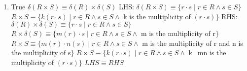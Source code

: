 \documentclass{4320hw}
\begin{document}
\begin{exercises}
\begin{enumerate}
\item
True
\newline
$\delta(R \times S) \equiv \delta(R) \times \delta(S)$
\newline
LHS:
\newline
$\delta(R \times S) \equiv \{ r \cdot s \mid r \in R \wedge s \in S\}$
\newline
$R \times S  \equiv \{k(r \cdot s) \mid r \in R \wedge s \in S \wedge $ k is the multiplicity of $(r \cdot s) \}$
\newline 
RHS:
\newline
$\delta(R) \times \delta(S) \equiv  \{ r \cdot s \mid r \in R \wedge s \in S\}$ 
\newline
$R \times \delta(S) \equiv \{ m(r) \cdot s \mid r \in R \wedge s \in S \wedge $ m is the multiplicity of r$\}$
\newline
$R \times S \equiv \{ m(r) \cdot n(s) \mid r \in R \wedge s \in S \wedge $ m is the multiplicity of r  and n is the multiplicity of s$\}$
\newline
$R \times S  \equiv \{k(r \cdot s) \mid r \in R \wedge s \in S \wedge $ k=mn is the multiplicity of $(r \cdot s) \}$
\newline
$LHS \equiv RHS$


\end{enumerate}
\end{exercises}
\end{document}
